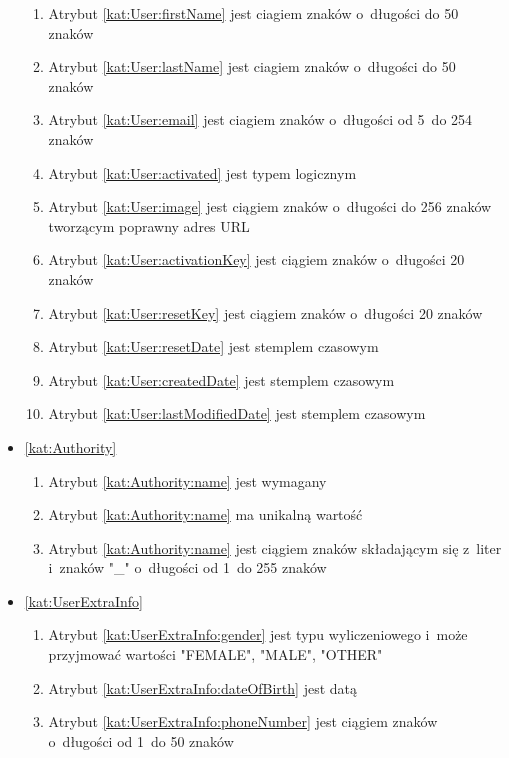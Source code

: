\begin{itemize}[label={\textbf{Ograniczenia dla}}, wide, labelwidth=!, labelindent=0pt]
\begin{enumerate}[label={\textbf{OGR/\protect\threedigits{\arabic{enumi}}}}, wide, labelwidth=!, align=left, leftmargin=3cm, resume]
        \item Atrybut \ref{kat:User:firstName} jest ciagiem znaków o~długości do 50 znaków
        \item Atrybut \ref{kat:User:lastName} jest ciagiem znaków o~długości do 50 znaków
        \item Atrybut \ref{kat:User:email} jest ciagiem znaków o~długości od 5~do 254 znaków
        \item Atrybut \ref{kat:User:activated} jest typem logicznym
        \item Atrybut \ref{kat:User:image} jest ciągiem znaków o~długości do 256 znaków tworzącym poprawny adres URL
        \item Atrybut \ref{kat:User:activationKey} jest ciągiem znaków o~długości 20 znaków
        \item Atrybut \ref{kat:User:resetKey} jest ciągiem znaków o~długości 20 znaków
        \item Atrybut \ref{kat:User:resetDate} jest stemplem czasowym
        \item Atrybut \ref{kat:User:createdDate} jest stemplem czasowym
        \item Atrybut \ref{kat:User:lastModifiedDate} jest stemplem czasowym
    \end{enumerate}
    \item\ref{kat:Authority}
    \begin{enumerate}[label={\textbf{OGR/\protect\threedigits{\arabic{enumi}}}}, wide, labelwidth=!, align=left, leftmargin=3cm, resume]
        \item Atrybut \ref{kat:Authority:name} jest wymagany
        \item Atrybut \ref{kat:Authority:name} ma unikalną wartość
        \item Atrybut \ref{kat:Authority:name} jest ciągiem znaków składającym się z~liter i~znaków "\_" o~długości od 1~do 255 znaków
    \end{enumerate}
    \item\ref{kat:UserExtraInfo}
    \begin{enumerate}[label={\textbf{OGR/\protect\threedigits{\arabic{enumi}}}}, wide, labelwidth=!, align=left, leftmargin=3cm, resume]
        \item Atrybut \ref{kat:UserExtraInfo:gender} jest typu wyliczeniowego i~może przyjmować wartości "FEMALE", "MALE", "OTHER"
        \item Atrybut \ref{kat:UserExtraInfo:dateOfBirth} jest datą
        \item Atrybut \ref{kat:UserExtraInfo:phoneNumber} jest ciągiem znaków o~długości od 1~do 50 znaków

\end{enumerate}
\end{itemize}
